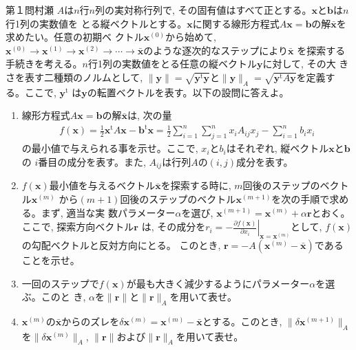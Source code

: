 \begin{question}{第１問}{村瀬}
\def\transpose{^{\mathrm{t}}}
$A$は$n$行$n$列の実対称行列で, その固有値はすべて正とする。$\bm{x}$と$\bm{b}$は$n$行1列の実数値を
とる縦ベクトルとする。$\bm{x}$に関する線形方程式$A\bm{x}=\bm{b}$の解$\bar{\bm{x}}$を求めたい。任意の初期ベ
クトル$\bm{x}^{(0)}$から始めて, $\bm{x}^{(0)}\to\bm{x}^{(1)}\to\bm{x}^{(2)}\to\cdots\to\bar{\bm{x}}$のような逐次的なステップにより$\bar{\bm{x}}$
を探索する手続きを考える。$n$行1列の実数値をとる任意の縦ベクトル$\bm{y}$に対して, その大
きさを表す二種類のノルムとして, $\|\bm{y}\|=\sqrt{\bm{y}\transpose\bm{y}}$と$\|\bm{y}\|_A=\sqrt{\bm{y}\transpose A\bm{y}}$を定義する。ここで, $\bm{y}\transpose$
は$\bm{y}$の転置ベクトルを表す。以下の設問に答えよ。
\begin{enumerate}
\item
  線形方程式$A\bm{x}=\bm{b}$の解$\bar{\bm{x}}$は, 次の量
  \begin{align*}
    f(\bm{x})
      = \frac12 \bm{x}\transpose A\bm{x} - \bm{b}\transpose\bm{x}
      = \frac12\sum_{i=1}^n \sum_{j=1}^n x_i A_{ij} x_j - \sum_{i=1}^n b_i x_i
  \end{align*}
  の最小値で与えられる事を示せ。ここで, $x_i$と$b_i$はそれぞれ, 縦ベクトル$\bm{x}$と$\bm{b}$の
  $i$番目の成分を表す。また, $A_{ij}$は行列$A$の$(i, j)$成分を表す。

\item
  $f(\bm{x})$最小値を与えるベクトル$\bar{\bm{x}}$を探索する時に, $m$回後のステップのベクトル$\bm{x}^{(m)}$
  から$(m+1)$回後のステップのベクトル$\bm{x}^{(m+1)}$を次の手順で求める。まず, 適当な実
  数パラメーター$\alpha$を選び, $\bm{x}^{(m+1)} = \bm{x}^{(m)} + \alpha\bm{r}$とおく。ここで, 探索方向ベクトル$\bm{r}$
  は, その成分を$r_i=-\left.\frac{\partial f(\bm{x})}{\partial x_i}\right|_{\bm{x}=\bm{x}^{(m)}}$として, $f(\bm{x})$の勾配ベクトルと反対方向にとる。
  このとき, $\bm{r}=-A(\bm{x}^{(m)}-\bar{\bm{x}})$であることを示せ。

\item
  一回のステップで$f(\bm{x})$が最も大きく減少するようにパラメーター$\alpha$を選ぶ。このと
  き, $\alpha$を$\|\bm{r}\|$と$\|\bm{r}\|_A$を用いて表せ。

\item
  $\bm{x}^{(m)}$の$\bar{\bm{x}}$からのズレを$\delta\bm{x}^{(m)}=\bm{x}^{(m)}-\bar{\bm{x}}$とする。このとき, $\|\delta\bm{x}^{(m+1)}\|_A$を$\|\delta\bm{x}^{(m)}\|_A$, 
  $\|\bm{r}\|$および$\|\bm{r}\|_A$を用いて表せ。


\end{enumerate}
\end{question}
